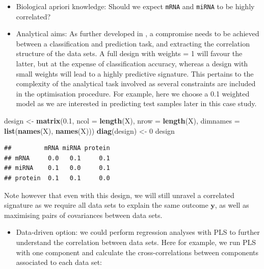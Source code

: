 \documentclass[]{book}
\newenvironment{Shaded}{\begin{snugshade}}{\end{snugshade}}
\newcommand{\KeywordTok}[1]{\textcolor[rgb]{0.13,0.29,0.53}{\textbf{#1}}}
\newcommand{\DataTypeTok}[1]{\textcolor[rgb]{0.13,0.29,0.53}{#1}}
\newcommand{\DecValTok}[1]{\textcolor[rgb]{0.00,0.00,0.81}{#1}}
\newcommand{\FloatTok}[1]{\textcolor[rgb]{0.00,0.00,0.81}{#1}}
\newcommand{\StringTok}[1]{\textcolor[rgb]{0.31,0.60,0.02}{#1}}
\newcommand{\NormalTok}[1]{#1}
\providecommand{\tightlist}{%
  \setlength{\itemsep}{0pt}\setlength{\parskip}{0pt}}
\begin{document}
\begin{itemize}
\item
  Biological apriori knowledge: Should we expect \texttt{mRNA} and
  \texttt{miRNA} to be highly correlated?
\item
  Analytical aims: As further developed in \citet{Sin19}, a compromise
  needs to be achieved between a classification and prediction task, and
  extracting the correlation structure of the data sets. A full design
  with weights = 1 will favour the latter, but at the expense of
  classification accuracy, whereas a design with small weights will lead
  to a highly predictive signature. This pertains to the complexity of
  the analytical task involved as several constraints are included in
  the optimisation procedure. For example, here we choose a 0.1 weighted
  model as we are interested in predicting test samples later in this
  case study.
\end{itemize}

\begin{Shaded}
\begin{Highlighting}[]
\NormalTok{design <-}\StringTok{ }\KeywordTok{matrix}\NormalTok{(}\FloatTok{0.1}\NormalTok{, }\DataTypeTok{ncol =} \KeywordTok{length}\NormalTok{(X), }\DataTypeTok{nrow =} \KeywordTok{length}\NormalTok{(X), }
                \DataTypeTok{dimnames =} \KeywordTok{list}\NormalTok{(}\KeywordTok{names}\NormalTok{(X), }\KeywordTok{names}\NormalTok{(X)))}
\KeywordTok{diag}\NormalTok{(design) <-}\StringTok{ }\DecValTok{0}
\NormalTok{design }
\end{Highlighting}
\end{Shaded}

\begin{verbatim}
##         mRNA miRNA protein
## mRNA     0.0   0.1     0.1
## miRNA    0.1   0.0     0.1
## protein  0.1   0.1     0.0
\end{verbatim}

Note however that even with this design, we will still unravel a
correlated signature as we require all data sets to explain the same
outcome \(\boldsymbol y\), as well as maximising pairs of covariances
between data sets.

\begin{itemize}
\tightlist
\item
  Data-driven option: we could perform regression analyses with PLS to
  further understand the correlation between data sets. Here for
  example, we run PLS with one component and calculate the
  cross-correlations between components associated to each data set:
\end{itemize}
\end{document}
